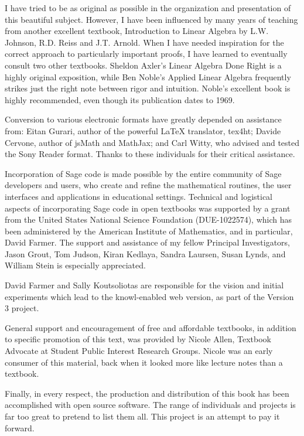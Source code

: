 \documentclass{ximera}
\begin{document}
I have tried to be as original as possible in the organization and presentation of this beautiful subject. However, I have been influenced by many years of teaching from another excellent textbook, Introduction to Linear Algebra by L.W. Johnson, R.D. Reiss and J.T. Arnold. When I have needed inspiration for the correct approach to particularly important proofs, I have learned to eventually consult two other textbooks. Sheldon Axler's Linear Algebra Done Right is a highly original exposition, while Ben Noble's Applied Linear Algebra frequently strikes just the right note between rigor and intuition. Noble's excellent book is highly recommended, even though its publication dates to 1969.

Conversion to various electronic formats have greatly depended on assistance from: Eitan Gurari, author of the powerful LaTeX translator, tex4ht; Davide Cervone, author of jsMath and MathJax; and Carl Witty, who advised and tested the Sony Reader format. Thanks to these individuals for their critical assistance.

Incorporation of Sage code is made possible by the entire community of Sage developers and users, who create and refine the mathematical routines, the user interfaces and applications in educational settings. Technical and logistical aspects of incorporating Sage code in open textbooks was supported by a grant from the United States National Science Foundation (DUE-1022574), which has been administered by the American Institute of Mathematics, and in particular, David Farmer. The support and assistance of my fellow Principal Investigators, Jason Grout, Tom Judson, Kiran Kedlaya, Sandra Laursen, Susan Lynds, and William Stein is especially appreciated.

David Farmer and Sally Koutsoliotas are responsible for the vision and initial experiments which lead to the knowl-enabled web version, as part of the Version 3 project.

General support and encouragement of free and affordable textbooks, in addition to specific promotion of this text, was provided by Nicole Allen, Textbook Advocate at Student Public Interest Research Groups. Nicole was an early consumer of this material, back when it looked more like lecture notes than a textbook.

Finally, in every respect, the production and distribution of this book has been accomplished with open source software. The range of individuals and projects is far too great to pretend to list them all. This project is an attempt to pay it forward.
  
\end{document}
